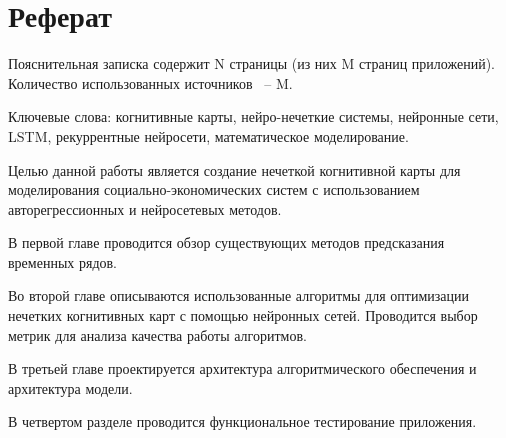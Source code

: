 \chapter*{Реферат}
\thispagestyle{plain}

Пояснительная записка содержит N страницы (из них M страниц приложений). Количество использованных источников ~-- M.

Ключевые слова: когнитивные карты, нейро-нечеткие системы,
нейронные сети, LSTM, рекуррентные нейросети, математическое моделирование.

Целью данной работы является создание нечеткой когнитивной карты для моделирования
социально-экономических систем с использованием авторегрессионных и нейросетевых методов.

В первой главе проводится обзор существующих методов предсказания временных рядов.

Во второй главе описываются использованные алгоритмы для оптимизации нечетких
когнитивных карт с помощью нейронных сетей.
Проводится выбор метрик для анализа качества работы алгоритмов.

В третьей главе проектируется архитектура алгоритмического обеспечения
и архитектура модели.

В четвертом разделе проводится функциональное тестирование приложения.
